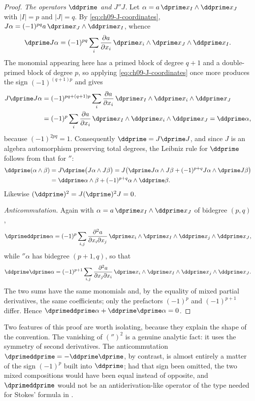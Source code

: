 \begin{proof}
\emph{The operators $\ddprime$ and $J\dprime J$.}  Let
$\alpha=a\,\dprime x_I\wedge\ddprime x_J$ with $|I|=p$ and $|J|=q$.  By
\eqref{eq:ch09-J-coordinates}, $J\alpha=(-1)^{pq}a\,\dprime x_J\wedge\ddprime x_I$,
whence
\[
 \dprime J\alpha
 =(-1)^{pq}\sum_i\frac{\partial a}{\partial x_i}\,
   \dprime x_i\wedge\dprime x_J\wedge\ddprime x_I .
\]
The monomial appearing here has a primed block of degree $q+1$ and a
double-primed block of degree $p$, so applying
\eqref{eq:ch09-J-coordinates} once more produces the sign $(-1)^{(q+1)p}$ and
gives
\[
\begin{aligned}
 J\dprime J\alpha
 &=(-1)^{pq+(q+1)p}\sum_i\frac{\partial a}{\partial x_i}\,
   \dprime x_I\wedge\ddprime x_i\wedge\ddprime x_J\\
 &=(-1)^{p}\sum_i\frac{\partial a}{\partial x_i}\,
   \dprime x_I\wedge\ddprime x_i\wedge\ddprime x_J
 =\ddprime\alpha,
\end{aligned}
\]
because $(-1)^{2pq}=1$.  Consequently
$\ddprime=J\dprime J$, and since $J$ is an algebra automorphism preserving
total degrees, the Leibniz rule for $\ddprime$ follows from that for
$\dprime$:
\[
\begin{aligned}
 \ddprime(\alpha\wedge\beta)
 &=J\dprime\bigl(J\alpha\wedge J\beta\bigr)
 =J\bigl(\dprime J\alpha\wedge J\beta
   +(-1)^{p+q}J\alpha\wedge\dprime J\beta\bigr)\\
 &=\ddprime\alpha\wedge\beta+(-1)^{p+q}\alpha\wedge\ddprime\beta .
\end{aligned}
\]
Likewise $(\ddprime)^2=J(\dprime)^2J=0$.

\emph{Anticommutation.}  Again with $\alpha=a\,\dprime x_I\wedge\ddprime x_J$
of bidegree $(p,q)$,
\[
 \dprimeddprime\alpha
 =(-1)^{p}\sum_{i,j}\frac{\partial^2a}{\partial x_i\partial x_j}\,
   \dprime x_i\wedge\dprime x_I\wedge\ddprime x_j\wedge\ddprime x_J,
\]
while $\dprime\alpha$ has bidegree $(p+1,q)$, so that
\[
 \ddprime\dprime\alpha
 =(-1)^{p+1}\sum_{i,j}\frac{\partial^2a}{\partial x_j\partial x_i}\,
   \dprime x_i\wedge\dprime x_I\wedge\ddprime x_j\wedge\ddprime x_J .
\]
The two sums have the same monomials and, by the equality of mixed partial
derivatives, the same coefficients; only the prefactors $(-1)^p$ and
$(-1)^{p+1}$ differ.  Hence $\dprimeddprime\alpha+\ddprime\dprime\alpha=0$.
\end{proof}

Two features of this proof are worth isolating, because they explain the
shape of the convention.  The vanishing of $(\dprime)^2$ is a genuine
analytic fact: it uses the symmetry of second derivatives.  The
anticommutation $\dprimeddprime=-\ddprime\dprime$, by contrast, is almost
entirely a matter of the sign $(-1)^p$ built into $\ddprime$; had that sign
been omitted, the two mixed compositions would have been equal instead of
opposite, and $\dprimeddprime$ would not be an antiderivation-like operator of
the type needed for Stokes' formula in
.

